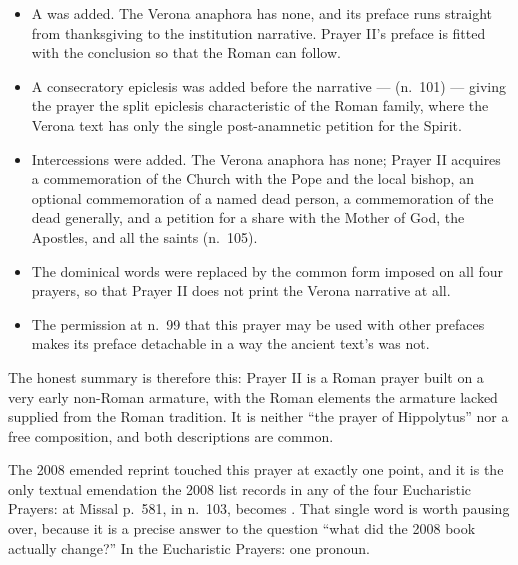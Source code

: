\begin{itemize}
\item A  was added. The Verona anaphora has none, and its preface runs straight
from thanksgiving to the institution narrative. Prayer II's preface is fitted with the
conclusion  so that the Roman  can follow.
\item A consecratory epiclesis was added before the narrative ---  (n.\ 101) --- giving the prayer the split epiclesis characteristic of the Roman
family, where the Verona text has only the single post-anamnetic petition for the Spirit.
\item Intercessions were added. The Verona anaphora has none; Prayer II acquires a
commemoration of the Church with the Pope and the local bishop, an optional commemoration of a
named dead person, a commemoration of the dead generally, and a petition for a share with the
Mother of God, the Apostles, and all the saints (n.\ 105).
\item The dominical words were replaced by the common form imposed on all four prayers, so that
Prayer II does not print the Verona narrative at all.
\item The permission at n.\ 99 that this prayer may be used with other prefaces makes its
preface detachable in a way the ancient text's was not.
\end{itemize}

The honest summary is therefore this: Prayer II is a Roman prayer built on a very early
non-Roman armature, with the Roman elements the armature lacked supplied from the Roman
tradition. It is neither ``the prayer of Hippolytus'' nor a free composition, and both
descriptions are common.

The 2008 emended reprint touched this prayer at exactly one point, and it is the only textual
emendation the 2008 list records in any of the four Eucharistic Prayers: at Missal p.\ 581, in
n.\ 103,  becomes . That single word is worth pausing over, because it is a precise
answer to the question ``what did the 2008 book actually change?'' In the Eucharistic Prayers:
one pronoun.

